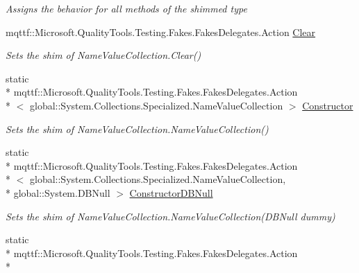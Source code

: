 \begin{DoxyCompactItemize}
\begin{DoxyCompactList}\small\item\em Assigns the behavior for all methods of the shimmed type\end{DoxyCompactList}\item 
mqttf\-::\-Microsoft.\-Quality\-Tools.\-Testing.\-Fakes.\-Fakes\-Delegates.\-Action \hyperlink{class_system_1_1_collections_1_1_specialized_1_1_fakes_1_1_shim_name_value_collection_af81cade875225aed5cca6717264574cb}{Clear}
\begin{DoxyCompactList}\small\item\em Sets the shim of Name\-Value\-Collection.\-Clear()\end{DoxyCompactList}\item 
static \\*
mqttf\-::\-Microsoft.\-Quality\-Tools.\-Testing.\-Fakes.\-Fakes\-Delegates.\-Action\\*
$<$ global\-::\-System.\-Collections.\-Specialized.\-Name\-Value\-Collection $>$ \hyperlink{class_system_1_1_collections_1_1_specialized_1_1_fakes_1_1_shim_name_value_collection_a8f5355c9598edd3ed06440577c0db351}{Constructor}
\begin{DoxyCompactList}\small\item\em Sets the shim of Name\-Value\-Collection.\-Name\-Value\-Collection()\end{DoxyCompactList}\item 
static \\*
mqttf\-::\-Microsoft.\-Quality\-Tools.\-Testing.\-Fakes.\-Fakes\-Delegates.\-Action\\*
$<$ global\-::\-System.\-Collections.\-Specialized.\-Name\-Value\-Collection, \\*
global\-::\-System.\-D\-B\-Null $>$ \hyperlink{class_system_1_1_collections_1_1_specialized_1_1_fakes_1_1_shim_name_value_collection_af3d16cc74e92edefee249d943d614b11}{Constructor\-D\-B\-Null}
\begin{DoxyCompactList}\small\item\em Sets the shim of Name\-Value\-Collection.\-Name\-Value\-Collection(\-D\-B\-Null dummy)\end{DoxyCompactList}\item 
static \\*
mqttf\-::\-Microsoft.\-Quality\-Tools.\-Testing.\-Fakes.\-Fakes\-Delegates.\-Action\\*

\end{DoxyCompactItemize}
